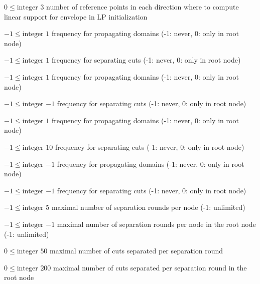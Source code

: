 %
{$0\leq\textrm{integer}$}%
{$3$}%
{number of reference points in each direction where to compute linear support for envelope in LP initialization}%
{}

%
{$-1\leq\textrm{integer}$}%
{$1$}%
{frequency for propagating domains (-1: never, 0: only in root node)}%
{}

%
{$-1\leq\textrm{integer}$}%
{$1$}%
{frequency for separating cuts (-1: never, 0: only in root node)}%
{}

%
{$-1\leq\textrm{integer}$}%
{$1$}%
{frequency for propagating domains (-1: never, 0: only in root node)}%
{}

%
{$-1\leq\textrm{integer}$}%
{$-1$}%
{frequency for separating cuts (-1: never, 0: only in root node)}%
{}

%
{$-1\leq\textrm{integer}$}%
{$1$}%
{frequency for propagating domains (-1: never, 0: only in root node)}%
{}

%
{$-1\leq\textrm{integer}$}%
{$10$}%
{frequency for separating cuts (-1: never, 0: only in root node)}%
{}

%
{$-1\leq\textrm{integer}$}%
{$-1$}%
{frequency for propagating domains (-1: never, 0: only in root node)}%
{}

%
{$-1\leq\textrm{integer}$}%
{$-1$}%
{frequency for separating cuts (-1: never, 0: only in root node)}%
{}

%
{$-1\leq\textrm{integer}$}%
{$5$}%
{maximal number of separation rounds per node (-1: unlimited)}%
{}

%
{$-1\leq\textrm{integer}$}%
{$-1$}%
{maximal number of separation rounds per node in the root node (-1: unlimited)}%
{}

%
{$0\leq\textrm{integer}$}%
{$50$}%
{maximal number of cuts separated per separation round}%
{}

%
{$0\leq\textrm{integer}$}%
{$200$}%
{maximal number of cuts separated per separation round in the root node}%
{}

